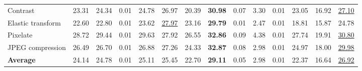 \begin{table}[t]
{\begin{tabular}{lrrrrrrrrrrrrr}
Contrast & 23.31 & 24.34 & 0.01 & 24.78 & 26.97 & 20.39 & \textbf{30.98} & 0.07 & 3.30 & 0.01 & 23.05 & 16.92 & \underline{27.10} \\
Elastic transform & 22.60 & 22.80 & 0.01 & 23.62 & \underline{27.97} & 23.16 & \textbf{29.79} & 0.01 & 2.47 & 0.01 & 18.81 & 15.87 & 24.78 \\
Pixelate & 28.72 & 29.44 & 0.01 & 29.63 & 27.92 & 26.55 & \textbf{32.86} & 0.09 & 4.38 & 0.01 & 27.74 & 19.91 & \underline{30.80} \\
JPEG compression & 26.49 & 26.70 & 0.01 & 26.88 & 27.26 & 24.33 & \textbf{32.87} & 0.08 & 2.98 & 0.01 & 24.97 & 18.00 & \underline{29.98} \\
\midrule
\textbf{Average} & 24.14 & 24.78 & 0.01 & 25.11 & 25.45 & 22.70 & \textbf{29.11} & 0.05 & 2.98 & 0.01 & 22.37 & 16.64 & \underline{26.92} \\
\bottomrule
\end{tabular}%
}
\end{table}

